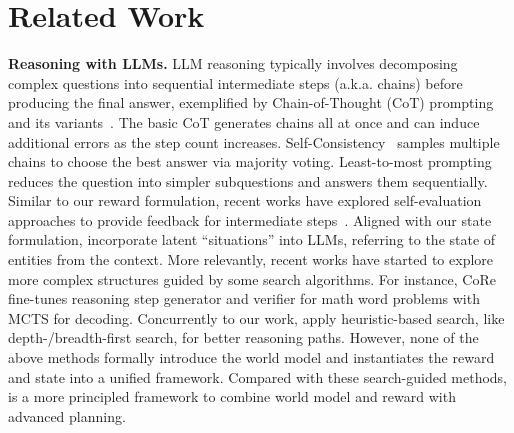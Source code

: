 
\section{Related Work}



\noindent \textbf{Reasoning with LLMs.}
LLM reasoning typically involves decomposing complex questions into sequential intermediate steps (a.k.a. chains) before producing the final answer, exemplified by Chain-of-Thought (CoT) prompting and its variants~\cite{wei2022chain, kojima2022large}. The basic CoT generates chains all at once and can induce additional errors as the step count increases. Self-Consistency~\cite{wang2022self} samples multiple chains to choose the best answer via majority voting. Least-to-most prompting~\cite{zhou2022least} reduces the question into simpler subquestions and answers them sequentially. Similar to our reward formulation, recent works have explored self-evaluation approaches to provide feedback for intermediate steps~\cite{welleck2022generating, Shinn2023ReflexionAA, paul2023refiner}. Aligned with our state formulation, \citet{li2022language} incorporate latent ``situations'' into LLMs, referring to the state of entities from the context. More relevantly, recent works have started to explore more complex structures guided by some search algorithms. For instance, CoRe~\cite{zhu2022solving} fine-tunes reasoning step generator and verifier for math word problems with MCTS for decoding. Concurrently to our work, \citet{yao2023tree} apply heuristic-based search, like depth-/breadth-first search, for better reasoning paths. However, none of the above methods formally introduce the world model and instantiates the reward and state into a unified framework. Compared with these search-guided methods, \ours is a more principled framework to combine world model and reward with advanced planning.




